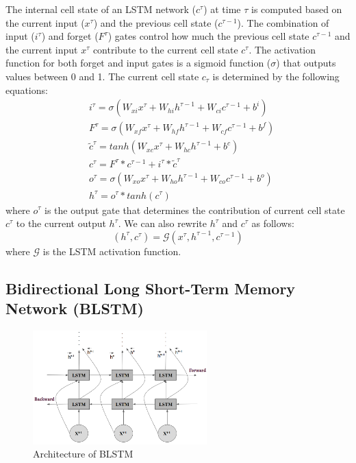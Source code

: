 The internal cell state of an LSTM network ($c^{\tau}$) at time $\tau$ is computed based on the current input ($x^{\tau}$) and the previous cell state ($c^{\tau-1}$).
The combination of input ($i^{\tau}$) and forget ($F^{\tau}$) gates control how much the previous cell state $c^{\tau-1}$ and the current input $x^{\tau}$ contribute to the current cell state $c^{\tau}$.
The activation function for both forget and input gates is a sigmoid function ($\sigma$) that outputs values between 0 and 1. The current cell state  $c_\tau$ is determined by the following equations: 
\begin{align}
& i^\tau = \sigma(W_{xi} x^\tau + W_{hi} h^{\tau-1} + W_{ci} c^{\tau-1} + b^i) \\ 
& F^\tau = \sigma(W_{xf} x^\tau + W_{hf} h^{\tau-1} + W_{cf} c^{\tau-1} + b^f) \\ 
& \tilde{c}^{\tau} = tanh(W_{xc} x^{\tau} + W_{hc} h^{\tau-1} + b^c) \\ 
& c^{\tau} = F^\tau * c^{\tau-1} + i^{\tau} * \tilde{c}^\tau\\
& o^\tau = \sigma(W_{xo} x^\tau + W_{ho} h^{\tau-1} + W_{co} c^{\tau-1} + b^o) \\ 
& h^\tau = o^\tau * tanh(c^\tau) 
\end{align}
where $o^\tau$ is the output gate that determines the contribution of  current cell state $c^\tau$ to the current output $h^\tau$. We can also rewrite $h^\tau$ and $c^\tau$ as follows:
\[
(h^\tau, c^\tau) = \mathcal{G}(x^\tau, h^{\tau-1}, c^{\tau-1})
\]
where $\mathcal{G}$ is the LSTM activation function. 


\subsection{Bidirectional Long Short-Term Memory Network (BLSTM)}
\label{BLSTM}
\begin{figure}
\centering
   \includegraphics[width=0.6\textwidth]{Chapters/BLSTM.png}
\caption[Architecture of BLSTM]{Architecture of BLSTM }
\label{fig:LSTM}
\end{figure}

